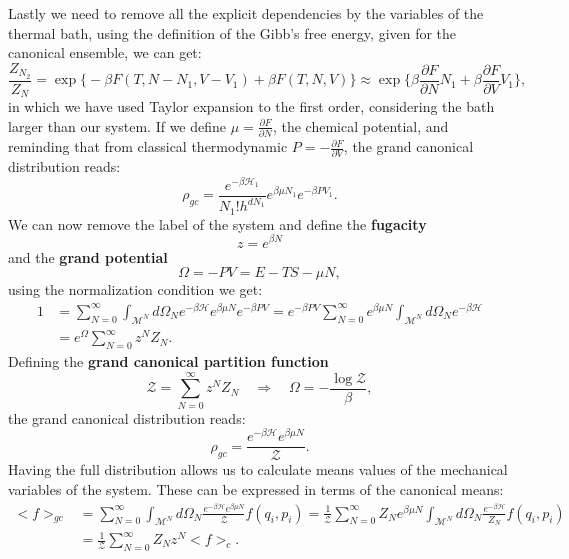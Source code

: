 Lastly we need to remove all the explicit dependencies by the variables of the thermal bath, using the definition of the Gibb's free energy, given for the canonical ensemble, we can get:
\begin{equation*}
    \frac{Z_{N_2}}{Z_N}= \exp\bigg\{-\beta F(T,N-N_1,V-V_1)+\beta F(T,N,V)\bigg\}\approx \exp\bigg\{\beta\frac{\partial F}{\partial N}N_1+\beta\frac{\partial F}{\partial V}V_1\bigg\},
\end{equation*}
in which we have used Taylor expansion to the first order, considering the bath larger than our system. If we define $\mu=\frac{\partial F}{\partial N}$, the chemical potential, and reminding that from classical thermodynamic $P=-\frac{\partial F}{\partial V}$, the grand canonical distribution reads:
\begin{equation*}
    \rho_{gc}=\frac{e^{-\beta\mathcal{H}_1 }}{N_1!h^{dN_1}}e^{\beta\mu N_1}e^{-\beta PV_1}.
\end{equation*}
We can now remove the label of the system and define the \textbf{fugacity}
\begin{equation*}
    z=e^{\beta N}
\end{equation*}
and the \textbf{grand potential}
\begin{equation*}
    \Omega=-PV=E-TS-\mu N,
\end{equation*}
using the normalization condition we get:
\begin{align*}
    1&=\sum_{N=0}^{\infty}\int_{\mathcal{M}^N}d\Omega_Ne^{-\beta\mathcal{H}}e^{\beta\mu N}e^{-\beta PV}=e^{-\beta PV}\sum_{N=0}^{\infty}e^{\beta\mu N}\int_{\mathcal{M}^N}d\Omega_Ne^{-\beta\mathcal{H}}\\&=e^{\Omega}\sum_{N=0}^{\infty}z^{N}Z_N.
\end{align*}
Defining the \textbf{grand canonical partition function}
\begin{equation}
    \label{GCPartitionFunc}\mathcal{Z} =\sum_{N=0}^{\infty}z^{N}Z_N\quad\Rightarrow\quad \Omega=-\frac{\log\mathcal{Z} }{\beta},
\end{equation}
the grand canonical distribution reads:
\begin{equation}
    \label{GrandCanonicalDistribution} \rho_{gc}=\frac{e^{-\beta\mathcal{H} }e^{\beta\mu N}}{\mathcal{Z}}.
\end{equation}
Having the full distribution allows us to calculate means values of the mechanical variables of the system. These can be expressed in terms of the canonical means:
\begin{align*}
    <f>_{gc}&=\sum_{N=0}^{\infty}\int_{\mathcal{M}^N}d\Omega_N\frac{e^{-\beta\mathcal{H} }e^{\beta\mu N}}{\mathcal{Z}}f(q_i,p_i)=\frac{1}{\mathcal{Z} }\sum_{N=0}^{\infty}Z_Ne^{\beta\mu N}\int_{\mathcal{M}^N}d\Omega_N\frac{e^{-\beta\mathcal{H} }}{Z_N}f(q_i,p_i)\\&=\frac{1}{\mathcal{Z} }\sum_{N=0}^{\infty}Z_Nz^N<f>_c.
\end{align*}
